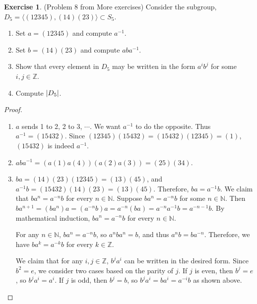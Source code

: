 \documentclass[12pt, psamsfonts]{amsart}
\theoremstyle{definition}
\newtheorem*{exer}{Exercise}
\theoremstyle{remark}
\numberwithin{equation}{section}
\begin{document}
\begin{exer}{(Problem 8 from More exercises)}
  Consider the subgroup, $D_5 = \langle (12345), (14)(23) \rangle \subset S_5$.
  \begin{enumerate}
    \item
      Set $a = (12345)$ and compute $a^{-1}$.
    \item
      Set $b = (14)(23)$ and compute $aba^{-1}$.
    \item
      Show that every element in $D_5$ may be written in the form $a^ib^j$ for some $i, j \in \mathbb{Z}$.
    \item
      Compute $\abs{D_5}$.
  \end{enumerate}
\end{exer}

\begin{proof}
  $ $
  \begin{enumerate}
    \item
      $a$ sends 1 to 2, 2 to 3, $\cdots$.
      We want $a^{-1}$ to do the opposite.
      Thus $a^{-1} = (15432)$.
      Since $(12345)(15432) = (15432)(12345) = (1)$, $(15432)$ is indeed $a^{-1}$.
    \item
      $aba^{-1} = (a(1)a(4))(a(2)a(3)) = (25)(34)$.
    \item
      $ba = (14)(23)(12345) = (13)(45)$, and $a^{-1}b = (15432)(14)(23) = (13)(45)$.
      Therefore, $ba = a^{-1}b$.
      We claim that $ba^n = a^{-n}b$ for every $n \in \mathbb{N}$.
      Suppose $ba^n = a^{-n}b$ for some $n \in \mathbb{N}$.
      Then $ba^{n + 1} = (ba^n)a = (a^{-n}b)a = a^{-n}(ba) = a^{-n}a^{-1}b = a^{-n-1}b$.
      By mathematical induction, $ba^n = a^{-n}b$ for every $n \in \mathbb{N}$.

      For any $n \in \mathbb{N}$, $ba^n = a^{-n}b$, so $a^nba^n = b$, and thus $a^nb = ba^{-n}$.
      Therefore, we have $ba^k = a^{-k}b$ for every $k \in \mathbb{Z}$.

      We claim that for any $i, j \in \mathbb{Z}$, $b^ja^i$ can be written in the desired form.
      Since $b^2 = e$, we consider two cases based on the parity of $j$.
      If $j$ is even, then $b^j = e$, so $b^ja^i = a^i$.
      If $j$ is odd, then $b^j = b$, so $b^ja^i = ba^i = a^{-i}b$ as shown above.


\end{enumerate}
\end{proof}
\end{document}
